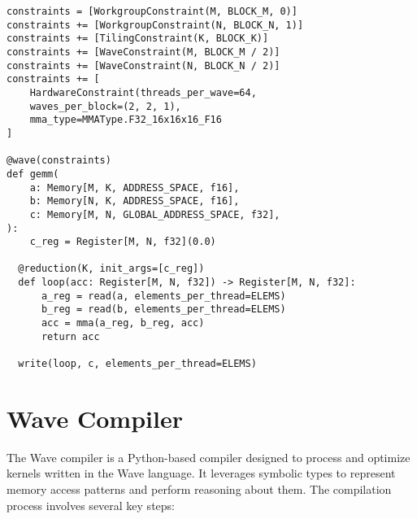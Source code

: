 \documentclass{article}
\begin{document}
\begin{lstlisting}[language=Wave, frame=single, breaklines, caption={Mixed-precision $C = A \times B^{T}$ expressed in Wave.}, captionpos=b, label={lst:gemm}]
constraints = [WorkgroupConstraint(M, BLOCK_M, 0)]
constraints += [WorkgroupConstraint(N, BLOCK_N, 1)]
constraints += [TilingConstraint(K, BLOCK_K)]
constraints += [WaveConstraint(M, BLOCK_M / 2)]
constraints += [WaveConstraint(N, BLOCK_N / 2)]
constraints += [
    HardwareConstraint(threads_per_wave=64,
    waves_per_block=(2, 2, 1),
    mma_type=MMAType.F32_16x16x16_F16
]

@wave(constraints)
def gemm(
    a: Memory[M, K, ADDRESS_SPACE, f16],
    b: Memory[N, K, ADDRESS_SPACE, f16],
    c: Memory[M, N, GLOBAL_ADDRESS_SPACE, f32],
):
    c_reg = Register[M, N, f32](0.0)

  @reduction(K, init_args=[c_reg])
  def loop(acc: Register[M, N, f32]) -> Register[M, N, f32]:
      a_reg = read(a, elements_per_thread=ELEMS)
      b_reg = read(b, elements_per_thread=ELEMS)
      acc = mma(a_reg, b_reg, acc)
      return acc

  write(loop, c, elements_per_thread=ELEMS)
\end{lstlisting}

\section{Wave Compiler}
\label{section:wave_compiler}
The Wave compiler is a Python-based compiler designed to process and optimize kernels written in the Wave language. It leverages symbolic types to represent memory access patterns and perform reasoning about them. The compilation process involves several key steps:
\end{document}

